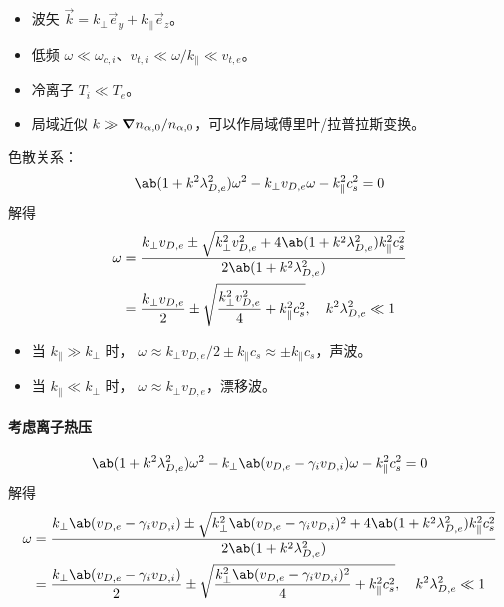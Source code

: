 \begin{itemize}
    \item 波矢 $\vec{k} = k_\perp \vec{e}_y + k_\parallel \vec{e}_z$。
    \item 低频 $\omega \ll \omega_{c,i}$、$v_{t,i} \ll \omega / k_\parallel \ll v_{t,e}$。
    \item 冷离子 $T_i \ll T_e$。
    \item 局域近似 $k \gg \bm{\nabla}{n_{\alpha,0}}/n_{\alpha,0}$，可以作局域傅里叶/拉普拉斯变换。
\end{itemize}

色散关系：
\begin{equation}
\ab(1 + k^2 \lambda_{D,e}^2) \omega^2 - k_\perp v_{D,e} \omega - k_\parallel^2 c_s^2 = 0
\end{equation}
解得
\begin{equation}\begin{aligned}
\omega &= \frac{
    k_\perp v_{D,e} \pm \sqrt{k_\perp^2 v_{D,e}^2
    + 4 \ab(1 + k^2 \lambda_{D,e}^2) k_\parallel^2 c_s^2}
}{
    2 \ab(1 + k^2 \lambda_{D,e}^2)
} \\
&= \frac{k_\perp v_{D,e}}{2} \pm \sqrt{\frac{k_\perp^2 v_{D,e}^2}{4}
    + k_\parallel^2 c_s^2}, \quad k^2 \lambda_{D,e}^2 \ll 1
\end{aligned}\end{equation}

\begin{itemize}
    \item 当 $k_\parallel \gg k_\perp$ 时，
    $\omega \approx k_\perp v_{D,e}/2 \pm k_\parallel c_s \approx \pm k_\parallel c_s$，声波。
    \item 当 $k_\parallel \ll k_\perp$ 时，
    $\omega \approx k_\perp v_{D,e}$，漂移波。
\end{itemize}

\paragraph{考虑离子热压}
\begin{equation}
\ab(1 + k^2 \lambda_{D,e}^2) \omega^2
- k_\perp \ab(v_{D,e} - \gamma_i v_{D,i}) \omega
- k_\parallel^2 c_s^2 = 0
\end{equation}
解得
\begin{equation}\begin{aligned}
\omega &= \frac{
    k_\perp \ab(v_{D,e} - \gamma_i v_{D,i}) \pm \sqrt{k_\perp^2 \ab(v_{D,e} - \gamma_i v_{D,i})^2
    + 4 \ab(1 + k^2 \lambda_{D,e}^2) k_\parallel^2 c_s^2}
}{
    2 \ab(1 + k^2 \lambda_{D,e}^2)
} \\
&= \frac{k_\perp \ab(v_{D,e} - \gamma_i v_{D,i})}{2} \pm \sqrt{\frac{k_\perp^2 \ab(v_{D,e} - \gamma_i v_{D,i})^2}{4}
    + k_\parallel^2 c_s^2}, \quad k^2 \lambda_{D,e}^2 \ll 1
\end{aligned}\end{equation}

